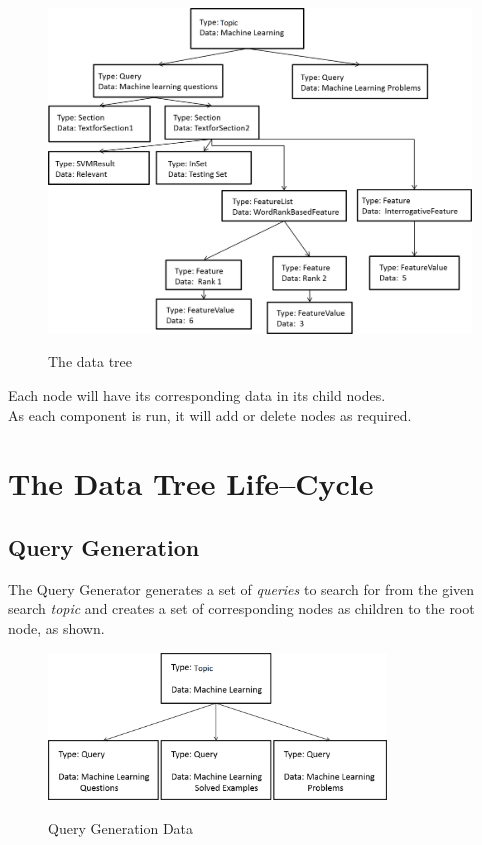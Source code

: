\documentclass[a4paper,10pt]{report}
\begin{document}
\begin{figure}[h!]
\centering
\includegraphics[width=\textwidth]{./diagrams/tree}\\
\caption{The data tree}
\end{figure}

Each node will have its corresponding data in its child nodes. \\

As each component is run, it will add or delete nodes as required. \\

\clearpage
\section*{The Data Tree Life--Cycle}

\subsection{Query Generation}

The Query Generator generates a set of \emph{queries} to search for from the given search \emph{topic} and creates a set of corresponding nodes as children to the root node, as shown.

\begin{figure}[h!]
\centering
\includegraphics[width=0.80\textwidth]{./diagrams/tree1}\\
\caption{Query Generation Data}
\end{figure}
\end{document}
